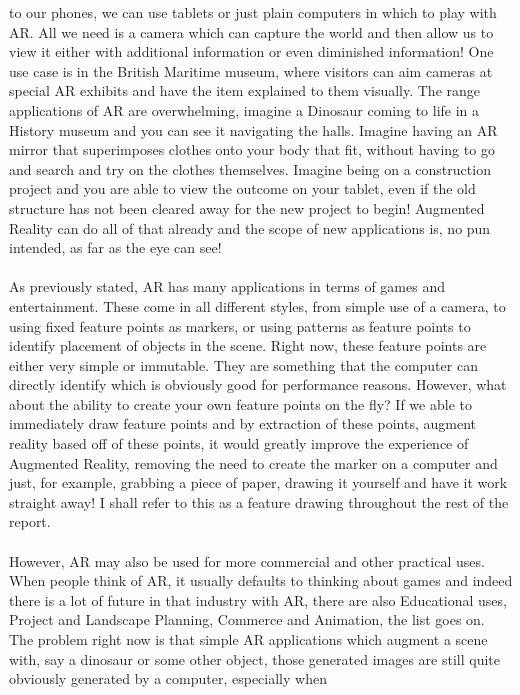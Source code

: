 \documentclass[11pt]{report}
\begin{document}
to our phones, we can use tablets or just plain computers in which to play
with AR. All we need is a camera which can capture the world and then allow 
us to view it either with additional information or even diminished information!
One use case is in the British Maritime museum, where visitors can aim cameras
at special AR exhibits and have the item explained to them visually. The range 
applications of AR are overwhelming, imagine a Dinosaur coming to life in a
History museum and you can see it navigating the halls. Imagine having an
AR mirror that superimposes clothes onto your body that fit, without having
to go and search and try on the clothes themselves. Imagine being on a 
construction project and you are able to view the outcome on your tablet, even
if the old structure has not been cleared away for the new project to begin!
Augmented Reality can do all of that already and the scope of new
applications is, no pun intended, as far as the eye can see!    
\\ \\
As previously stated, AR has many applications in terms of games and 
entertainment. These come in all different styles, from simple use of a camera,
to using fixed feature points as markers, or using patterns as feature points
to identify placement of objects in the scene. Right now, these feature points
are either very simple or immutable. They are something that the computer
can directly identify which is obviously good for performance reasons. However,
what about the ability to create your own feature points on the fly? If we
able to immediately draw feature points and by extraction of these points, 
augment reality based off of these points, it would greatly improve the 
experience of Augmented Reality, removing the need to create the marker 
on a computer and just, for example, grabbing a piece of paper, drawing it
yourself and have it work straight away! I shall refer to this as a feature
drawing throughout the rest of the report. 
\\ \\
However, AR may also be used for more commercial and other practical uses. 
When people think of AR, it usually defaults to thinking about games and 
indeed there is a lot of future in that industry with AR, there are also
Educational uses, Project and Landscape Planning, Commerce and Animation, 
the list goes on. The problem right now is that simple AR applications which
augment a scene with, say a dinosaur or some other object, those generated
images are still quite obviously generated by a computer, especially when 
\end{document}
